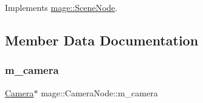 Implements \hyperlink{classmage_1_1_scene_node_a9c8b7cde14ec45f383d214332f789736}{mage\+::\+Scene\+Node}.



\subsection{Member Data Documentation}
\hypertarget{classmage_1_1_camera_node_aee902112c2e70e8de69b69aed303ca1f}{}\label{classmage_1_1_camera_node_aee902112c2e70e8de69b69aed303ca1f} 
\subsubsection{\texorpdfstring{m\+\_\+camera}{m\_camera}}
{\footnotesize\ttfamily \hyperlink{classmage_1_1_camera}{Camera}$\ast$ mage\+::\+Camera\+Node\+::m\+\_\+camera\hspace{0.3cm}{\ttfamily [protected]}}

